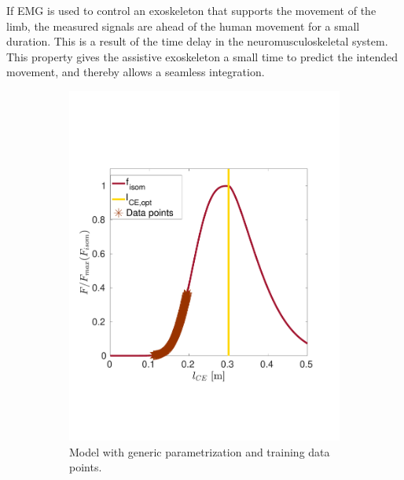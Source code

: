 If EMG is used to control an exoskeleton that supports the movement of the limb, the measured signals are ahead of the human movement for a small duration. This is a result of the time delay in the neuromusculoskeletal system. This property gives the assistive exoskeleton a small time to predict the intended movement, and thereby allows a seamless integration.

\begin{figure}%
  \centering%
  \begin{subfigure}[t]{0.47\textwidth}%
    \centering%
    \includegraphics[width=\textwidth]{images/summer_school_study/biceps_initial.pdf}%
    \caption{Model with generic parametrization and training data points.}%
    \label{fig:biceps_a}%
  \end{subfigure}%
  \quad
  \begin{subfigure}[t]{0.47\textwidth}%
    \centering%

\end{subfigure}
\end{figure}
